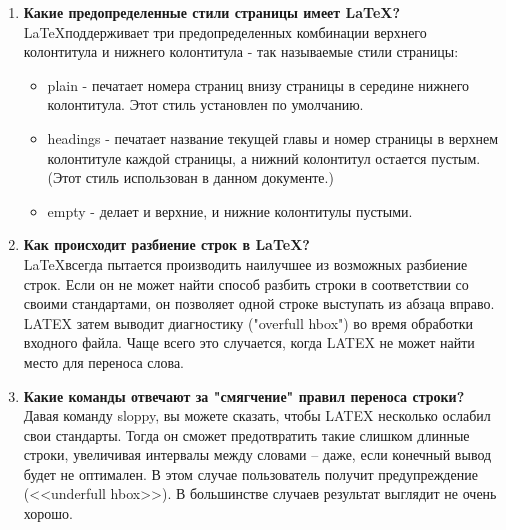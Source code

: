 \documentclass[a4paper,12pt]{article} %
\begin{document}
\begin{enumerate}
Команды  LATEX чувствительны к регистру и принимают одну из следующих двух форм:
\begin{itemize}
\item Они начинаются с символа backslash $\backslash$ и продолжаются именем, состоящим только из букв. Имена команд завершаются пробелом, цифрой или любой другой <<не-буквой>>.
\item Они состоят из $\backslash$ и ровно одного специального символа. LATEX игнорирует пробелы после команд. Если вы хотите получить  пробел после команды, вы должны поместить или \{ \} и пробел, или специальную команду пробела после имени команды. \{ \} не дает LATEX игнорировать все пробелы после имени команды.
\end{itemize}

\item  \textbf{Какие предопределенные стили страницы имеет \LaTeX?}\\

\LaTeX поддерживает три предопределенных комбинации верхнего колонтитула и нижнего колонтитула - так называемые стили страницы:
\begin{itemize}
\item plain - печатает номера страниц внизу страницы в середине нижнего колонтитула. Этот стиль установлен по умолчанию.
\item headings - печатает название текущей главы и номер страницы в верхнем колонтитуле каждой страницы, а нижний колонтитул остается пустым. (Этот стиль использован в данном документе.)
\item empty - делает и верхние, и нижние колонтитулы пустыми.
\end{itemize}

\item  \textbf{Как происходит разбиение строк в \LaTeX?}\\

\LaTeX всегда пытается производить наилучшее из возможных разбиение строк. Если он не может найти способ разбить строки в соответствии со своими стандартами, он позволяет одной строке выступать из абзаца вправо. LATEX затем выводит диагностику ("overfull hbox") во время обработки входного файла. Чаще всего это случается, когда LATEX не может найти место для переноса слова. 

\item  \textbf{Какие команды отвечают за "смягчение" правил переноса строки?}\\

Давая команду sloppy, вы можете сказать, чтобы LATEX несколько ослабил свои стандарты. Тогда он сможет предотвратить такие слишком длинные строки, увеличивая интервалы между словами -- даже, если конечный вывод будет не оптимален. В этом случае пользователь получит предупреждение (<<underfull hbox>>). В большинстве случаев результат выглядит не очень хорошо. 


\end{enumerate}
\end{document}
